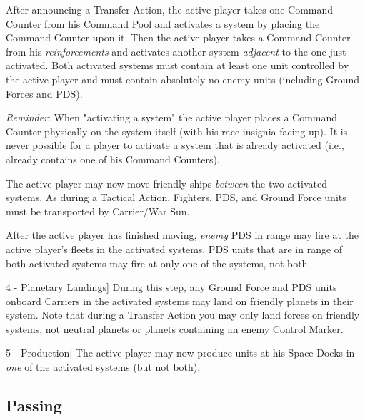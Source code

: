 \documentclass[11pt,fleqn]{book} %
\begin{document}
\begin{description}
    \item[1 - Activate two Systems]
    After announcing a Transfer Action, the active player takes one Command Counter from his Command Pool and activates a system by placing the Command Counter upon it. Then the active player takes a Command Counter from his \emph{reinforcements} and activates another system \emph{adjacent} to the one just activated. Both activated systems must contain at least one unit controlled by the active player and must contain absolutely no enemy units (including Ground Forces and PDS).

    \emph{Reminder}: When "activating a system" the active player places a Command Counter physically on the system itself (with his race insignia facing up). It is never possible for a player to activate a system that is already activated (i.e., already contains one of his Command Counters).

\item [2- Movement]
    The active player may now move friendly ships \emph{between} the two activated systems. As during a Tactical Action, Fighters, PDS, and Ground Force units must be transported by Carrier/War Sun.

\item[3 - PDS Fire]
After the active player has finished moving, \emph{enemy} PDS in range may fire at the active player's fleets in the activated systems. PDS units that are in range of both activated systems may fire at only one of the systems, not both.

\item 4 - Planetary Landings]
During this step, any Ground Force and PDS units onboard Carriers in the activated systems may land on friendly planets in their system. Note that during a Transfer Action you may only land forces on friendly systems, not neutral planets or planets containing an enemy Control Marker.

\item 5 - Production]
The active player may now produce units at his Space Docks in \emph{one} of the activated systems (but not both).

\end{description}


\subsection{Passing}     %
\label{sub:passing}
\end{document}
